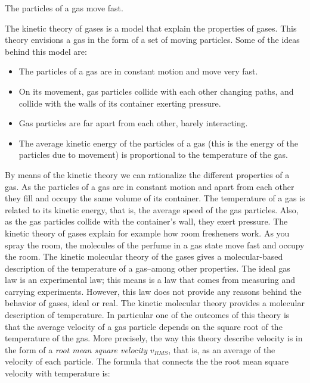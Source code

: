 \documentclass[main.tex]{subfiles}
\begin{document}
\begin{description}
\begin{marginfigure}[0cm]
\caption{The particles of a gas move fast.}
\end{marginfigure}%
The kinetic theory of gases is a model that explain the properties of gases. This theory envisions a gas in the form of a set of moving particles. Some of the ideas behind this model are: 
\begin{itemize}
\item  The particles of a gas are in constant motion and move very fast.
\item On its movement, gas particles collide with each other changing paths, and collide with the walls of its container exerting pressure.
\item  Gas particles are far apart from each other, barely interacting.
\item The average kinetic energy of the particles of a gas (this is the energy of the particles due to movement) is proportional to the temperature of the gas.
\end{itemize}
By means of the kinetic theory we can rationalize the different properties of a gas. As the particles of a gas are in constant motion and apart from each other they fill and occupy the same volume of its container. The temperature of a gas is related to its kinetic energy, that is, the average speed of the gas particles. Also, as the gas particles collide with the container's wall, they exert pressure. The kinetic theory of gases explain for example how room fresheners work. As you spray the room, the molecules of the perfume in a gas state move fast and occupy the room.
The kinetic molecular theory of the gases gives a molecular-based description of the temperature of a gas--among other properties. The ideal gas law is an experimental law; this means is a law that comes from measuring and carrying experiments. However, this law does not provide any reasons behind the behavior of gases, ideal or real. The kinetic molecular theory provides a molecular description of temperature. In particular one of the outcomes of this theory is that the average velocity of a gas particle depends on the square root of the temperature of the gas. More precisely, the way this theory describe velocity is in the form of a \emph{root mean square velocity} $v_{RMS}$, that is, as an average of the velocity of each particle. The formula that connects the the root mean square velocity with temperature is:


\end{description}
\end{document}
